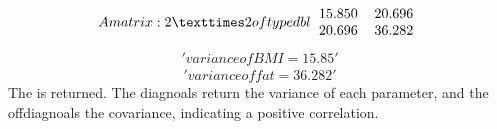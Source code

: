 \documentclass[letterpaper,10pt,english]{jupyterBook}
\begin{document}
\begin{sphinxVerbatim}[commandchars=\\\{\}]
  \PYG{p}{[}\PYG{p}{]}
\end{sphinxVerbatim}
\begin{equation*}
\begin{split}A matrix: 2 × 2 of type dbl
\begin{tabular}{ll}
	 15.850 & 20.696\\
	 20.696 & 36.282\\
\end{tabular}\end{split}
\end{equation*}\begin{equation*}
\begin{split}'variance of BMI = 15.85'\end{split}
\end{equation*}\begin{equation*}
\begin{split}'variance of fat = 36.282'\end{split}
\end{equation*}
\sphinxAtStartPar
The  is returned. The diagnoals return the variance of each parameter, and the off\sphinxhyphen{}diagnoals the covariance, indicating a positive correlation.
\end{document}
